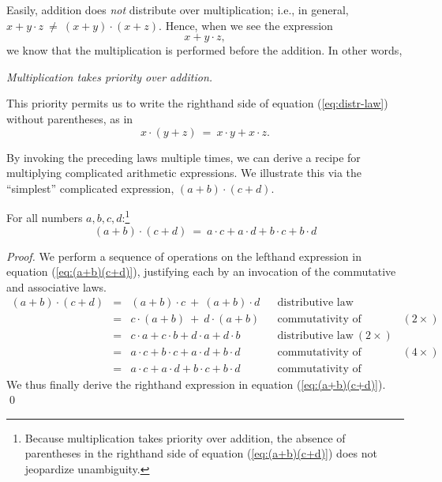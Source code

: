Easily, addition does {\em not} distribute over multiplication; i.e.,
in general, $x + y \cdot z \ \neq \ (x+y) \cdot (x+z)$.  Hence, when
we see the expression
\[ x + y \cdot z, \]
we know that the multiplication is performed before the addition.  In
other words,

 {\em Multiplication takes priority over addition.}

\noindent This priority permits us to write the righthand side of
equation (\ref{eq:distr-law}) without parentheses, as in
\[ x \cdot (y + z) \ = \ x \cdot y + x \cdot z. \]

\medskip

By invoking the preceding laws multiple times, we can derive a recipe
for multiplying complicated arithmetic expressions.  We illustrate
this via the ``simplest'' complicated expression, $(a+b) \cdot (c+d)$.

\begin{prop}
\label{prop:(a+b)(c+d)}
For all numbers $a, b, c, d$:\footnote{Because multiplication takes
  priority over addition, the absence of parentheses in the righthand
  side of equation (\ref{eq:(a+b)(c+d)}) does not jeopardize
  unambiguity.}
\begin{equation}
\label{eq:(a+b)(c+d)}
(a+b) \cdot (c+d) \ = \ a \cdot c + a \cdot d + b \cdot c + b \cdot d
\end{equation}
\end{prop}

\begin{proof}
We perform a sequence of operations on the lefthand expression in
equation (\ref{eq:(a+b)(c+d)}), justifying each by an invocation of
the commutative and associative laws.
\[
\begin{array}{lclll}
(a+b) \cdot (c+d) & = & (a+b) \cdot c \ + \ (a+b) \cdot d
& & \mbox{distributive law} \\ 
  & = & c \cdot (a+b) \ + \ d \cdot (a+b)
& & \mbox{commutativity of multiplication} \ (2 \times) \\
  & = & c \cdot a + c \cdot b + d \cdot a + d \cdot b 
& & \mbox{distributive law} \ (2 \times) \\
  & = & a \cdot c + b \cdot c + a \cdot d + b \cdot d
& & \mbox{commutativity of multiplication} \ (4 \times) \\
  & = &  a \cdot c + a \cdot d + b \cdot c + b \cdot d
& & \mbox{commutativity of addition}
\end{array}
\]
We thus finally derive the righthand expression in equation
(\ref{eq:(a+b)(c+d)}).  \qed
\end{proof}


